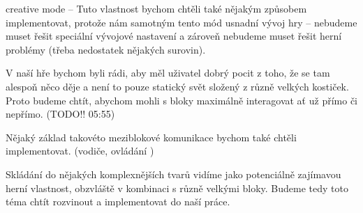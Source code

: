 creative mode -- Tuto vlastnost bychom chtěli také nějakým způsobem implementovat, protože nám samotným tento mód usnadní vývoj hry -- nebudeme muset řešit speciální vývojové nastavení a zároveň nebudeme muset řešit herní problémy (třeba nedostatek nějakých surovin). 



V naší hře bychom byli rádi, aby měl uživatel dobrý pocit z toho, že se tam alespoň něco děje a není to pouze statický svět složený z různě velkých kostiček. Proto budeme chtít, abychom mohli s bloky maximálně interagovat ať už přímo či nepřímo. (TODO!! 05:55)


Nějaký základ takovéto meziblokové komunikace bychom také chtěli implementovat. (vodiče, ovládání )



Skládání do nějakých komplexnějších tvarů vidíme jako potenciálně zajímavou herní vlastnost, obzvláště v kombinaci s různě velkými bloky. Budeme tedy toto téma chtít rozvinout a implementovat do naší práce. 




